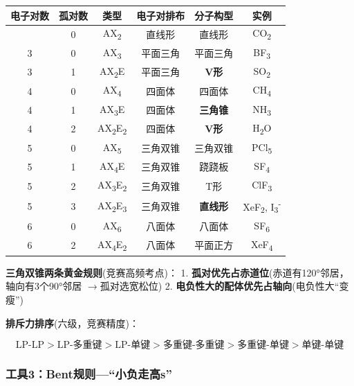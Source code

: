 \documentclass[a4paper,11pt]{ctexart}
\newcounter{none}
\newcommand{\箭}{\ensuremath{\rightarrow}}
\newcommand{\左箭}{\ensuremath{\leftarrow}}
\newcommand{\上箭}{\ensuremath{\uparrow}}
\newcommand{\下箭}{\ensuremath{\downarrow}}
\newcommand{\衡}{\ensuremath{\rightleftharpoons}}
\newcommand{\双箭}{\ensuremath{\leftrightarrow}}
\newcommand{\约等于}{\ensuremath{\approx}}
\newcommand{\小于等于}{\ensuremath{\leq}}
\newcommand{\大于等于}{\ensuremath{\geq}}
\newcommand{\不等于}{\ensuremath{\neq}}
\newcommand{\西格马}{\ensuremath{\sigma}}
\newcommand{\派}{\ensuremath{\pi}}
\begin{document}
{\def\LTcaptype{none} %
\begin{longtable}[]{@{}cccccc@{}}
\toprule\noalign{}
电子对数 & 孤对数 & 类型 & 电子对排布 & 分子构型 & 实例 \\
\midrule\noalign{}
\endhead
\bottomrule\noalign{}
\endlastfoot
2 & 0 & AX\textsubscript{2} & 直线形 & 直线形 & CO\textsubscript{2} \\
3 & 0 & AX\textsubscript{3} & 平面三角 & 平面三角 & BF\textsubscript{3} \\
3 & 1 & AX\textsubscript{2}E & 平面三角 & \textbf{V形} & SO\textsubscript{2} \\
4 & 0 & AX\textsubscript{4} & 四面体 & 四面体 & CH\textsubscript{4} \\
4 & 1 & AX\textsubscript{3}E & 四面体 & \textbf{三角锥} & NH\textsubscript{3} \\
4 & 2 & AX\textsubscript{2}E\textsubscript{2} & 四面体 & \textbf{V形} & H\textsubscript{2}O \\
5 & 0 & AX\textsubscript{5} & 三角双锥 & 三角双锥 & PCl\textsubscript{5} \\
5 & 1 & AX\textsubscript{4}E & 三角双锥 & 跷跷板 & SF\textsubscript{4} \\
5 & 2 & AX\textsubscript{3}E\textsubscript{2} & 三角双锥 & T形 & ClF\textsubscript{3} \\
5 & 3 & AX\textsubscript{2}E\textsubscript{3} & 三角双锥 & \textbf{直线形} & XeF\textsubscript{2}, I\textsubscript{3}\textsuperscript{-} \\
6 & 0 & AX\textsubscript{6} & 八面体 & 八面体 & SF\textsubscript{6} \\
6 & 2 & AX\textsubscript{4}E\textsubscript{2} & 八面体 & 平面正方 & XeF\textsubscript{4} \\
\end{longtable}
}

\textbf{三角双锥两条黄金规则}(竞赛高频考点)：
1. \textbf{孤对优先占赤道位}(赤道有120°邻居，轴向有3个90°邻居 \箭 孤对选宽松位)
2. \textbf{电负性大的配体优先占轴向}(电负性大``变瘦'')

\textbf{排斥力排序}(六级，竞赛精度)：

\[\text{LP-LP} > \text{LP-多重键} > \text{LP-单键} > \text{多重键-多重键} > \text{多重键-单键} > \text{单键-单键}\]

\subsubsection{工具3：Bent规则---``小负走高s''}\label{ux5de5ux51773bentux89c4ux5219ux5c0fux8d1fux8d70ux9ad8s}
\end{document}
